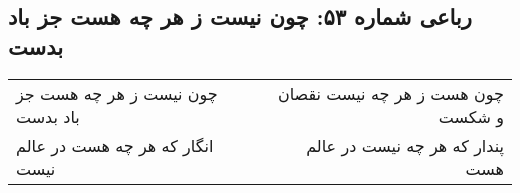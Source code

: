 \begin{center}
\section*{رباعی شماره ۵۳: چون نیست ز هر چه هست جز باد بدست}
\label{sec:sh053}
\begin{longtable}{l p{0.5cm} r}
چون نیست ز هر چه هست جز باد بدست
&&
چون هست ز هر چه نیست نقصان و شکست
\\
انگار که هر چه هست در عالم نیست
&&
پندار که هر چه نیست در عالم هست
\\
\end{longtable}
\end{center}
